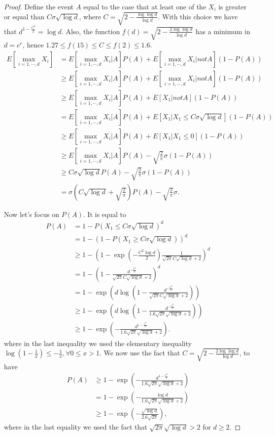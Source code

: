 \documentclass{article} %
\begin{document}
\begin{proof}

Define the event $A$ equal to the case that at least one of the $X_i$ is greater or equal than $C \sigma \sqrt{\log d}$, where $C=\sqrt{2-\frac{\log \log d}{\log d}}$. With this choice we have that $d^{1-\frac{C^2}{2}}=\log d$. Also, the function $f(d)=\sqrt{2-\frac{2\log \log d}{\log d}}$ has a minimum in $d=e^e$, hence $1.27 \leq f(15) \leq C\leq f(2)\leq 1.6$.
%
\begin{align*}
E[\max_{i=1,\cdots,d} X_i] 
&= E[\max_{i=1,\cdots,d} X_i| A ] P(A) + E[\max_{i=1,\cdots,d} X_i| not A ] (1-P(A)) \\
&\geq E[\max_{i=1,\cdots,d} X_i| A ] P(A) + E[\max_{i=1,\cdots,d} X_i| not A ] (1-P(A))\\
&\geq E[\max_{i=1,\cdots,d} X_i| A ] P(A) + E[X_1| not A ](1-P(A)) \\
&= E[\max_{i=1,\cdots,d} X_i| A ] P(A) + E[X_1| X_1\leq C \sigma \sqrt{\log d}] (1-P(A))\\
&\geq E[\max_{i=1,\cdots,d} X_i| A ] P(A) + E[X_1| X_1\leq 0](1-P(A)) \\
&\geq E[\max_{i=1,\cdots,d} X_i| A ] P(A) - \sqrt{\frac{2}{\pi}} \sigma (1-P(A))\\
&\geq C \sigma \sqrt{\log d} P(A) - \sqrt{\frac{2}{\pi}} \sigma (1-P(A))\\
&= \sigma \left(C\sqrt{\log d} +\sqrt{\frac{2}{\pi}}\right)P(A) -  \sqrt{\frac{2}{\pi}} \sigma.
\end{align*}

Now let's focus on $P(A)$. It is equal to
\begin{align*}
P(A) 
&= 1-P(X_1\leq C \sigma \sqrt{\log d})^d \\
&= 1-(1-P(X_1\geq C \sigma \sqrt{\log d}))^d \\
&\geq 1-\left(1-\exp\left(-\frac{C^2 \log d}{2}\right) \frac{1}{\sqrt{2\pi}C \sqrt{\log d}+2}\right)^d \\
&= 1-\left(1-\frac{d^{-\frac{C^2}{2}}}{\sqrt{2\pi}C \sqrt{\log d}+2}\right)^d \\
&= 1- \exp\left(d \log\left(1-\frac{d^{-\frac{C^2}{2}}}{\sqrt{2\pi}C \sqrt{\log d}+2}\right)\right) \\
&\geq 1- \exp\left(d \log\left(1-\frac{d^{-\frac{C^2}{2}}}{1.6 \sqrt{2\pi} \sqrt{\log d}+2}\right)\right) \\
&\geq 1 - \exp\left(-\frac{d^{1-\frac{C^2}{2}}}{1.6 \sqrt{2\pi} \sqrt{\log d}+2}\right).
\end{align*}
where in the last inequality we used the elementary inequality $\log(1-\frac{1}{x}) \leq -\frac{1}{x}, \forall  0\leq x>1$.
We now use the fact that $C=\sqrt{2- \frac{2 \log \log d}{\log d}}$, to have
\begin{align*}
P(A) 
& \geq 1 - \exp\left(-\frac{d^{1-\frac{C^2}{2}}}{1.6 \sqrt{2\pi} \sqrt{\log d}+2}\right) \\
& = 1 - \exp\left(-\frac{\log d}{1.6 \sqrt{2\pi} \sqrt{\log d}+2}\right) \\
& \geq 1 - \exp\left(-\frac{\sqrt{\log d}}{2.6 \sqrt{2\pi}}\right),
\end{align*}
where in the last equality we used the fact that $\sqrt{2\pi} \sqrt{\log d} > 2$ for $d\geq 2$.
 

\end{proof}
\end{document}
